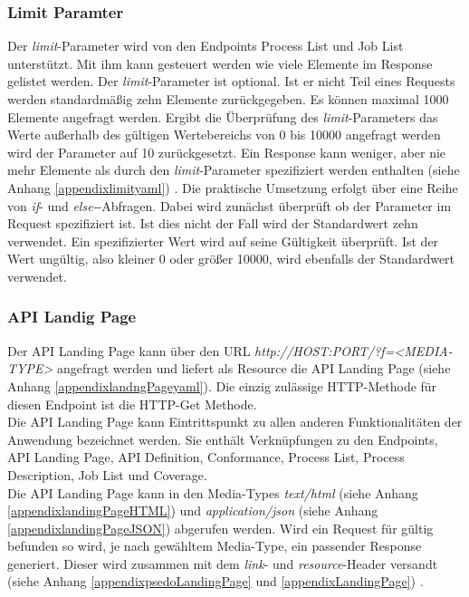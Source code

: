 \subsubsection{Limit Paramter}
Der \textit{limit}-Parameter wird von den Endpoints Process List und Job List unterstützt. Mit ihm kann gesteuert werden wie viele Elemente im Response gelistet werden. 
Der \textit{limit}-Parameter ist optional. Ist er nicht Teil eines Requests werden standardmäßig zehn Elemente zurückgegeben. Es können maximal 1000 Elemente angefragt werden.
Ergibt die Überprüfung des \textit{limit}-Parameters das Werte außerhalb des gültigen Wertebereichs von 0 bis 10000 angefragt werden wird der Parameter auf 10 zurückgesetzt. 
Ein Response kann weniger, aber nie mehr Elemente als durch den \textit{limit}-Parameter spezifiziert werden enthalten (siehe Anhang \ref{appendixlimityaml}) 
\cite{ogc_api_processes_core}. Die praktische Umsetzung erfolgt über eine Reihe von \textit{if}- und \textit{else-}-Abfragen. Dabei wird zunächst überprüft ob 
der Parameter im Request spezifiziert ist. Ist dies nicht der Fall wird der Standardwert zehn verwendet. Ein spezifizierter Wert wird auf seine Gültigkeit überprüft. 
Ist der Wert ungültig, also kleiner 0 oder größer 10000, wird ebenfalls der Standardwert verwendet.

\subsubsection{API Landig Page}
Der API Landing Page kann über den URL \textit{http://HOST:PORT/?f=<MEDIA-TYPE>} angefragt werden und liefert als Resource die 
API Landing Page (siehe Anhang \ref{appendixlandngPageyaml}). 
Die einzig zulässige HTTP-Methode für diesen Endpoint ist die HTTP-Get Methode.\\ 
Die API Landing Page kann Eintrittspunkt zu allen anderen Funktionalitäten der Anwendung bezeichnet werden. Sie enthält Verknüpfungen zu den Endpoints, API Landing Page, API Definition, 
Conformance, Process List, Process Description, Job List und Coverage.\\
Die API Landing Page kann in den Media-Types \textit{text/html} (siehe Anhang \ref{appendixlandingPageHTML}) und \textit{application/json} 
(siehe Anhang \ref{appendixlandingPageJSON}) abgerufen werden.
Wird ein Request für gültig befunden so wird, je nach gewähltem Media-Type, ein passender Response generiert. 
Dieser wird zusammen mit dem \textit{link}- und \textit{resource}-Header 
versandt (siehe Anhang \ref{appendixpsedoLandingPage} und \ref{appendixLandingPage}) \cite{ogc_api_processes_core}. 

